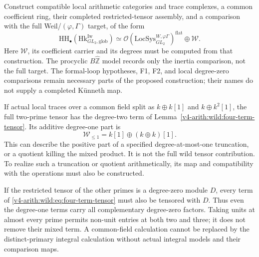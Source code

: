\begin{question}
\label{v4-arith:bzn-rcompletion:thm:F3-BZN-Ar-corrected}
Construct compatible local arithmetic categories and trace complexes,
a common coefficient ring, their completed restricted-tensor assembly,
and a comparison with the full Weil/\((\varphi,\Gamma)\) target, of the form
\begin{equation}
\label{v4-arith:bzn-rcompletion:eq:F3-BZN-Ar-corrected}
 \mathrm{HH}_{\bullet}(\mathrm{Hk}^{\mathrm{Iw}}_{GL_2,\mathrm{glob}})
 \simeq \mathcal O(\mathrm{LocSys}^{W,\varphi\Gamma}_{GL_2})^{\mathrm{flat}}
 \oplus\mathcal W.
\end{equation}
Here \(\mathcal W\), its coefficient carrier and its degrees must be
computed from that construction. The procyclic \(B\widehat{\mathbb Z}\)
model records only the inertia comparison, not the full target.
The formal-loop hypotheses, F1, F2, and local degree-zero comparisons
remain necessary parts of the proposed construction; their names do
not supply a completed K\"unneth map.

If actual local traces over a common field split as
\(k\oplus k[1]\) and \(k\oplus k^2[1]\), the full two-prime tensor
has the degree-two term of Lemma~\ref{v4-arith:wild:four-term-tensor}.
Its additive degree-one part is
\begin{equation}
\label{v4-arith:bzn-rcompletion:eq:wild-summand}
 \mathcal W_{\le1}=k[1]\oplus(k\oplus k)[1].
\end{equation}
This can describe the positive part of a specified degree-at-most-one
truncation, or a quotient killing the mixed product. It is not the full
wild tensor contribution. To realize such a truncation or quotient
arithmetically, its map and compatibility with the operations must
also be constructed.
\end{question}

\begin{remark}
\label{v4-arith:bzn-rcompletion:rem:domain}
If the restricted tensor of the other primes is a degree-zero module
\(D\), every term of \eqref{v4-arith:wild:eq:four-term-tensor} must
also be tensored with \(D\). Thus even the degree-one terms carry
all complementary degree-zero factors. Taking units at almost every
prime permits non-unit entries at both two and three; it does not
remove their mixed term. A common-field calculation cannot be
replaced by the distinct-primary integral calculation without actual
integral models and their comparison maps.
\end{remark}

